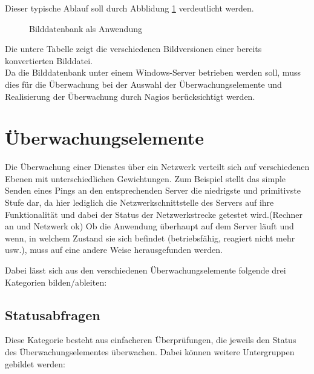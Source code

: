 Dieser typische Ablauf soll durch Abblidung \ref{bdbanw} verdeutlicht werden.
\begin{figure}[ht]
	\centering
		\caption{Bilddatenbank als Anwendung}
		\label{bdbanw}
\end{figure}

Die untere Tabelle zeigt die verschiedenen Bildversionen einer bereits konvertierten Bilddatei.\\

Da die Bilddatenbank unter einem Windows-Server betrieben werden soll, muss dies für die Überwachung bei der Auswahl der Überwachungselemente und Realisierung der Überwachung durch Nagios berücksichtigt werden.

\newpage
\section{Überwachungselemente}
\label{elemente}
Die Überwachung einer Dienstes über ein Netzwerk verteilt sich auf verschiedenen Ebenen mit unterschiedlichen Gewichtungen.
Zum Beispiel stellt das simple Senden eines Pings an den entsprechenden Server die niedrigste und primitivste Stufe dar, da hier lediglich die Netzwerkschnittstelle des Servers auf ihre Funktionalität und dabei der Status der Netzwerkstrecke getestet wird.(Rechner an und Netzwerk ok)
Ob die Anwendung überhaupt auf dem Server läuft und wenn, in welchem Zustand sie sich befindet (betriebsfähig, reagiert nicht mehr usw.), muss auf eine andere Weise herausgefunden werden.

Dabei lässt sich aus den verschiedenen Überwachungselemente folgende drei Kategorien bilden/ableiten:

\subsection{Statusabfragen}
\label{syschecks}
Diese Kategorie besteht aus einfacheren Überprüfungen, die jeweils den Status des Überwachungselementes überwachen.
Dabei können weitere Untergruppen gebildet werden:

